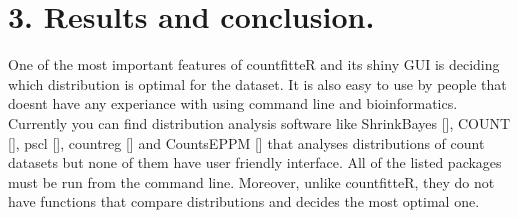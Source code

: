 % 
% 


\section{3. Results and conclusion.}

One of the most important features of countfitteR and its shiny GUI is deciding which distribution is optimal for the dataset. It is also easy to use by people that doesnt have any experiance with using command line and bioinformatics. 
Currently you can find distribution analysis software like ShrinkBayes [], COUNT [], pscl [], countreg [] and CountsEPPM [] that analyses distributions of count datasets but none of them have user friendly interface. All of the listed packages must be run from the command line. Moreover, unlike countfitteR, they do not have functions that compare distributions and decides the most optimal one.

